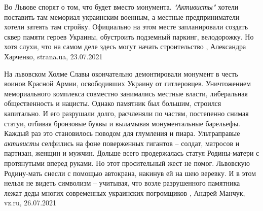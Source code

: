 Во Львове спорят о том, что будет вместо монумента. \emph{"Активисты"} хотели
поставить там мемориал украинским военным, а местные предприниматели хотели
затеять там стройку.  Официально на этом месте запланировали создать сквер
памяти героев Украины, обустроить подземный паркинг, велодорожку. Но хотя
слухи, что на самом деле здесь могут начать строительство
, 
Александра Харченко, strana.ua, 23.07.2021


На львовском Холме Славы окончательно демонтировали монумент в честь воинов
Красной Армии, освободивших Украину от гитлеровцев. Уничтожением мемориального
комплекса совместно занимались местные власти, либеральная общественность и
нацисты. Однако памятник был большим, строился капитально. И его разрушали
долго, расчленяли по частям, постепенно снимая статуи, отбивая бронзовые буквы
и выламывая монументальные барельефы.  Каждый раз это становилось поводом для
глумления и пиара. Ультраправые \emph{активисты} селфились на фоне поверженных
гигантов – солдат, матросов и партизан, женщин и мужчин. Дольше всего
продержалась статуя Родины-матери с протянутыми вперед руками. Но этот
просительный жест не помог. Львовскую Родину-мать снесли с помощью автокрана,
накинув ей на шею веревку. И в этом нельзя не видеть символизм – учитывая, что
возле разрушенного памятника лежат деды многих современных украинских
погромщиков
, 
Андрей Манчук, vz.ru, 26.07.2021
